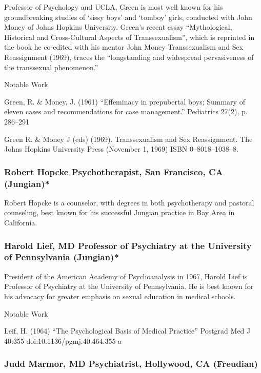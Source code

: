 Professor of Psychology and UCLA, Green is most well known for his groundbreaking studies of `sissy boys' and `tomboy' girls, conducted with John Money of Johns Hopkins University. Green's recent essay “Mythological, Historical and Cross-Cultural Aspects of Transsexualism”, which is reprinted in the book he co-edited with his mentor John Money Transsexualism and Sex Reassignment (1969), traces the “longstanding and widespread pervasiveness of the transsexual phenomenon.”

Notable Work

Green, R. \& Money, J. (1961) “Effeminacy in prepubertal boys; Summary of eleven cases and recommendations for case management.” Pediatrics 27(2), p. 286--291

Green R. \& Money J (eds) (1969). Transsexualism and Sex Reassignment. The Johns Hopkins University Press (November 1, 1969) ISBN 0--8018--1038--8.

\subsubsection{Robert Hopcke Psychotherapist, San Francisco, CA (Jungian)*}
\label{roberthopckepsychotherapistsanfranciscocajungian}

Robert Hopcke is a counselor, with degrees in both psychotherapy and pastoral counseling, best known for his successful Jungian practice in Bay Area in California.

\subsubsection{Harold Lief, MD Professor of Psychiatry at the University of Pennsylvania (Jungian)*}
\label{haroldliefmdprofessorofpsychiatryattheuniversityofpennsylvaniajungian}

President of the American Academy of Psychoanalysis in 1967, Harold Lief is Professor of Psychiatry at the University of Pennsylvania. He is best known for his advocacy for greater emphasis on sexual education in medical schools.

Notable Work

Leif, H. (1964) “The Psychological Basis of Medical Practice” Postgrad Med J 40:355 doi:10.1136\slash pgmj.40.464.355-a

\subsubsection{Judd Marmor, MD Psychiatrist, Hollywood, CA (Freudian)}
\label{juddmarmormdpsychiatristhollywoodcafreudian}


